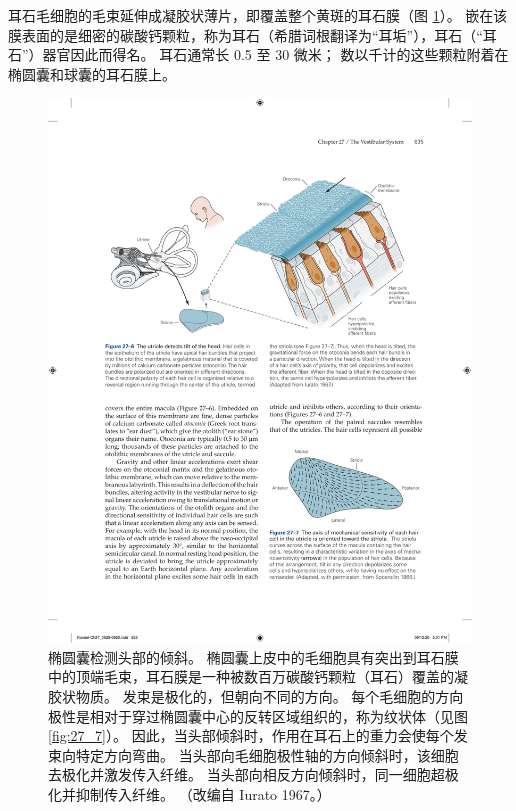 耳石毛细胞的毛束延伸成凝胶状薄片，即覆盖整个黄斑的耳石膜（图 \ref{fig:27_6}）。
嵌在该膜表面的是细密的碳酸钙颗粒，称为耳石（希腊词根翻译为“耳垢”），耳石（“耳石”）器官因此而得名。
耳石通常长 0.5 至 30 微米； 数以千计的这些颗粒附着在椭圆囊和球囊的耳石膜上。


\begin{figure}[htbp]
	\centering
	\includegraphics[width=0.9\linewidth]{chap27/fig_27_6}
	\caption{椭圆囊检测头部的倾斜。 椭圆囊上皮中的毛细胞具有突出到耳石膜中的顶端毛束，耳石膜是一种被数百万碳酸钙颗粒（耳石）覆盖的凝胶状物质。 发束是极化的，但朝向不同的方向。 每个毛细胞的方向极性是相对于穿过椭圆囊中心的反转区域组织的，称为纹状体（见图 \ref{fig:27_7}）。 因此，当头部倾斜时，作用在耳石上的重力会使每个发束向特定方向弯曲。 当头部向毛细胞极性轴的方向倾斜时，该细胞去极化并激发传入纤维。 当头部向相反方向倾斜时，同一细胞超极化并抑制传入纤维。 （改编自 Iurato 1967。）}
	\label{fig:27_6}
\end{figure}


